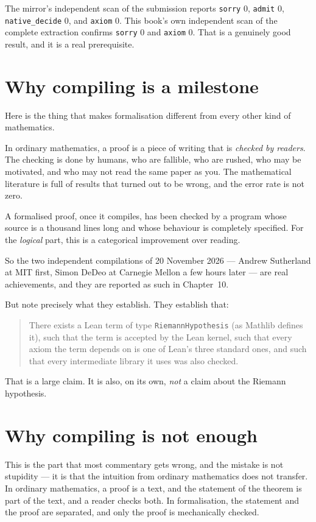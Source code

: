 The mirror's independent scan of the submission reports \texttt{sorry} 0,
\texttt{admit} 0, \texttt{native\_decide} 0, and \texttt{axiom} 0. This book's
own independent scan of the complete extraction confirms \texttt{sorry} 0 and
\texttt{axiom} 0. That is a genuinely good result, and it is a real
prerequisite.

\section{Why compiling is a milestone}Here is the thing that makes formalisation different from every other kind of
mathematics.

In ordinary mathematics, a proof is a piece of writing that is \emph{checked by
readers}. The checking is done by humans, who are fallible, who are rushed,
who may be motivated, and who may not read the same paper as you. The
mathematical literature is full of results that turned out to be wrong, and the
error rate is not zero.

A formalised proof, once it compiles, has been checked by a program whose
source is a thousand lines long and whose behaviour is completely specified. For
the \emph{logical} part, this is a categorical improvement over reading.

So the two independent compilations of 20 November 2026 --- Andrew Sutherland
at MIT first, Simon DeDeo at Carnegie Mellon a few hours later --- are real
achievements, and they are reported as such in Chapter~10.

But note precisely what they establish. They establish that:

\begin{quote}
There exists a Lean term of type \texttt{RiemannHypothesis} (as Mathlib
defines it), such that the term is accepted by the Lean kernel, such that every
axiom the term depends on is one of Lean's three standard ones, and such that
every intermediate library it uses was also checked.
\end{quote}

That is a large claim. It is also, on its own, \emph{not} a claim about the
Riemann hypothesis.

\section{Why compiling is not enough}This is the part that most commentary gets wrong, and the mistake is not
stupidity --- it is that the intuition from ordinary mathematics does not
transfer. In ordinary mathematics, a proof is a text, and the statement of the
theorem is part of the text, and a reader checks both. In formalisation, the
statement and the proof are separated, and only the proof is mechanically
checked.

